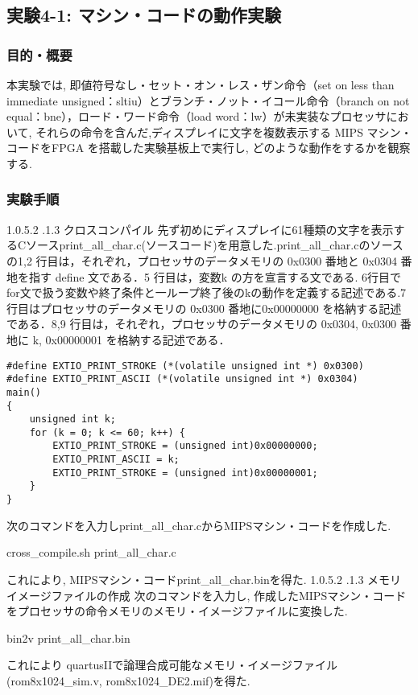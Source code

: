 \documentclass[epsf,a4paper,dvipdfmx,autodetect-engine,titlepage]{jsarticle}
\makeatletter
\newcommand{\subsubsubsection}
{\@startsection{paragraph}{4}{\z@}%
{1.0\Cvs \@plus.5\Cdp \@minus.2\Cdp}%
{.1\Cvs \@plus.3\Cdp}%
{\reset@font\sffamily\normalsize}}
\makeatother
\begin{document}
\subsection{実験4-1: マシン・コードの動作実験}
\subsubsection{目的・概要}
本実験では, 即値符号なし・セット・オン・レス・ザン命令（set on
less than immediate unsigned：sltiu）とブランチ・ノット・イコール命令（branch on not
equal：bne），ロード・ワード命令（load word：lw）が未実装なプロセッサにおいて, それらの命令を含んだ,ディスプレイに文字を複数表示する MIPS マシン・コードをFPGA を搭載した実験基板上で実行し, どのような動作をするかを観察する.
\subsubsection{実験手順}
\subsubsubsection{クロスコンパイル}
先ず初めにディスプレイに61種類の文字を表示するCソースprint\_all\_char.c(ソースコード)を用意した.print\_all\_char.cのソースの1,2 行目は，それぞれ，プロセッサのデータメモリの 0x0300 番地と 0x0304 番地を指す define 文である．5 行目は，変数k の方を宣言する文である. 6行目でfor文で扱う変数や終了条件と一ループ終了後のkの動作を定義する記述である.7行目はプロセッサのデータメモリの 0x0300 番地に0x00000000 を格納する記述である．8,9 行目は，それぞれ，プロセッサのデータメモリの 0x0304, 0x0300 番地に k, 0x00000001 を格納する記述である．
\begin{lstlisting}[caption=print\_all\_char.c, label=sec4]
#define EXTIO_PRINT_STROKE (*(volatile unsigned int *) 0x0300)
#define EXTIO_PRINT_ASCII (*(volatile unsigned int *) 0x0304)
main()
{
    unsigned int k;
    for (k = 0; k <= 60; k++) {
        EXTIO_PRINT_STROKE = (unsigned int)0x00000000;
        EXTIO_PRINT_ASCII = k;
        EXTIO_PRINT_STROKE = (unsigned int)0x00000001;
    }
}
\end{lstlisting}
次のコマンドを入力しprint\_all\_char.cからMIPSマシン・コードを作成した.
\begin{screen}
cross\_compile.sh print\_all\_char.c
\end{screen}
これにより, MIPSマシン・コードprint\_all\_char.binを得た.
\subsubsubsection{メモリイメージファイルの作成}
次のコマンドを入力し, 作成したMIPSマシン・コードをプロセッサの命令メモリのメモリ・イメージファイルに変換した.
\begin{screen}
bin2v print\_all\_char.bin
\end{screen}
これにより quartusIIで論理合成可能なメモリ・イメージファイル(rom8x1024\_sim.v, rom8x1024\_DE2.mif)を得た. 
\end{document}
